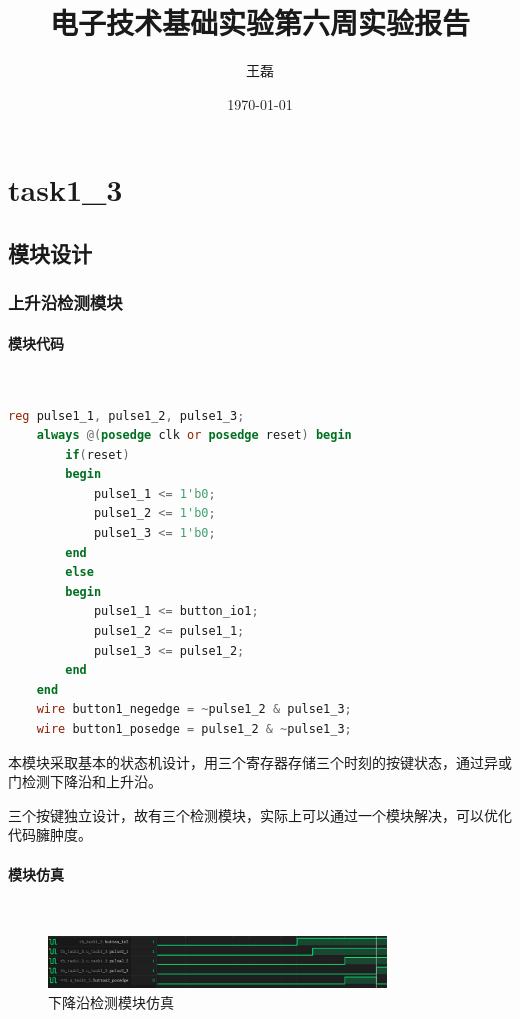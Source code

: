 \documentclass[UTF8]{ctexart}
\title{电子技术基础实验第六周实验报告}
\author{王磊\quad2022012972}
\date{\today}
\newcommand{\subsubsubsection}[1]{\paragraph{#1}\mbox{}\\}
\begin{document}
\maketitle
\section{task1\_3}
\subsection{模块设计}
\subsubsection{上升沿检测模块}
\subsubsubsection{模块代码}
\begin{framed}
    \begin{lstlisting}[language=verilog,style=verilogStyle]
    reg pulse1_1, pulse1_2, pulse1_3;
    always @(posedge clk or posedge reset) begin
        if(reset)
        begin 
            pulse1_1 <= 1'b0;
            pulse1_2 <= 1'b0;
            pulse1_3 <= 1'b0;
        end
        else
        begin
            pulse1_1 <= button_io1;
            pulse1_2 <= pulse1_1;
            pulse1_3 <= pulse1_2;
        end
    end
    wire button1_negedge = ~pulse1_2 & pulse1_3;
    wire button1_posedge = pulse1_2 & ~pulse1_3;
\end{lstlisting}
\end{framed}
本模块采取基本的状态机设计，用三个寄存器存储三个时刻的按键状态，通过异或门检测下降沿和上升沿。

三个按键独立设计，故有三个检测模块，实际上可以通过一个模块解决，可以优化代码臃肿度。
\subsubsubsection{模块仿真}
\begin{figure}[H]
    \centering
    \includegraphics[width=0.8\textwidth]{task1_3_1.png}
    \caption{下降沿检测模块仿真}
\end{figure}
\end{document}
